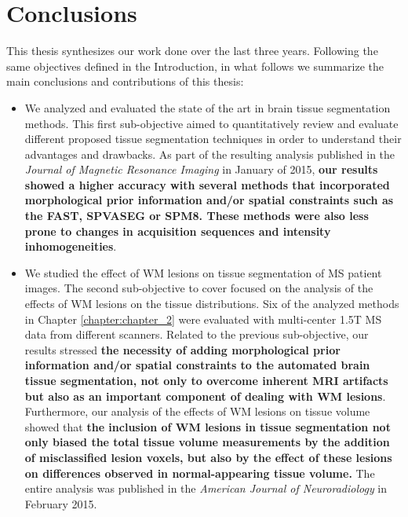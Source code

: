 \chapter{Conclusions}

This thesis synthesizes our work done over the last three years. Following the same objectives defined in the Introduction, in what follows  we summarize the main conclusions and contributions of this thesis: 

\begin{itemize}

\item We analyzed and evaluated the state of the art in brain tissue segmentation methods. This first sub-objective aimed to quantitatively review and evaluate different proposed tissue segmentation techniques in order to understand their advantages and drawbacks. As part of the resulting analysis published in the\textit{ Journal of Magnetic Resonance Imaging} in January of 2015,   \textbf{our results showed a higher accuracy with several methods that incorporated morphological prior information and/or spatial constraints such as the FAST, SPVASEG or SPM8. These methods were also less prone to changes in acquisition sequences and intensity inhomogeneities}.

\item We studied the effect of WM lesions on tissue segmentation of MS patient images. The second sub-objective to cover focused on the analysis of the effects of WM lesions on the tissue distributions. Six of the analyzed methods in Chapter \ref{chapter:chapter_2} were evaluated with multi-center 1.5T MS data from different scanners. Related to the previous sub-objective, our results stressed \textbf{the necessity of adding morphological prior information and/or spatial constraints to the automated brain tissue segmentation, not only to overcome inherent MRI artifacts but also as an important component of dealing with WM lesions}. Furthermore, our analysis of the effects of WM lesions on tissue volume showed that \textbf{the inclusion of WM lesions in tissue segmentation not only biased the total tissue volume measurements by the addition of misclassified lesion voxels, but also by the effect of these lesions on differences observed in normal-appearing tissue volume.} The entire analysis was published in the \textit{American Journal of Neuroradiology} in February 2015.


\end{itemize}
